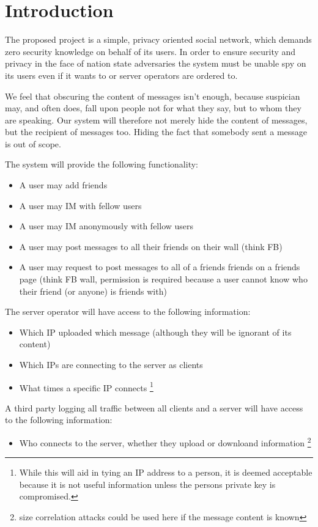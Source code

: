 \section{Introduction}
The proposed project is a simple, privacy oriented social network, which demands
zero security knowledge on behalf of its users. In order to ensure security and
privacy in the face of nation state adversaries the system must be unable spy on
its users even if it wants to or server operators are ordered to.

We feel that obscuring the content of messages isn't enough, because suspician
may, and often does, fall upon people not for what they say, but to whom they
are speaking. Our system will therefore not merely hide
the content of messages, but the recipient of messages too. Hiding the fact that
somebody sent a message is out of scope.

The system will provide the following functionality:
\begin{itemize}
\item A user may add friends
\item A user may IM with fellow users
\item A user may IM anonymously with fellow users
\item A user may post messages to all their friends on their wall (think FB)
\item A user may request to post messages to all of a friends friends on a
friends page (think FB wall, permission is required because a user cannot know
who their friend (or anyone) is friends with)
\end{itemize}

The server operator will have access to the following information:
\begin{itemize}
\item Which IP uploaded which message (although they will be ignorant of its
content)
\item Which IPs are connecting to the server as clients
\item What times a specific IP connects \footnote {While this will aid in tying
an IP address to a person, it is deemed acceptable because it is not useful
information unless the persons private key is compromised.}
\end{itemize}

A third party logging all traffic between all clients and a server will have
access to the following information:
\begin{itemize}
\item Who connects to the server, whether they upload or downloand information
\footnote{size correlation attacks could be used here if the message content is
known}
\end{itemize}

